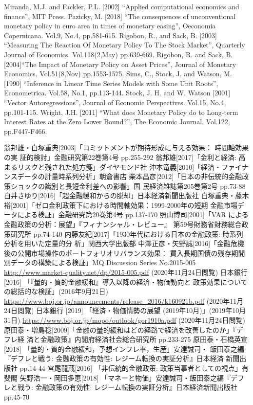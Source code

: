 \documentclass[12pt]{article}
\begin{document}
\begin{thebibliography}{99}
    \bibitem{} Miranda, M.J. and Fackler, P.L. [2002] “Applied computational economics and
    finance”, MIT Press.
    \bibitem{} Pazicky, M. [2018] “The consequences of unconventional monetary policy in euro
    area in times of monetary easing”, Oeconomia Copernicana. Vol.9, No.4, pp.581-615.
    \bibitem{} Rigobon, R., and Sack, B. [2003] “Measuring The Reaction Of Monetary Policy To
    The Stock Market”, Quarterly Journal of Economics. Vol.118(2,May) pp.639-669.
    \bibitem{} Rigobon, R. and Sack, B. [2004]“The Impact of Monetary Policy on Asset Prices”,
    Journal of Monetary Economics. Vol.51(8,Nov) pp.1553-1575.
    \bibitem{} Sims, C., Stock, J. and Watson, M. [1990] “Inference in Linear Time Series Models
    with Some Unit Roots”, Econometrica. Vol.58, No.1, pp.113-144.
    \bibitem{} Stock, J. H. and W. Watson [2001] “Vector Autoregressions”, Journal of Economic
    Perspectives. Vol.15, No.4, pp.101-115.
    \bibitem{} Wright, J.H. [2011] “What does Monetary Policy do to Long-term Interest Rates
    at the Zero Lower Bound?”, The Economic Journal. Vol.122, pp.F447-F466.
    
    \bibitem{}  翁邦雄・白塚重典[2003]「コミットメントが期待形成に与える効果： 時間軸効果の実
    証的検討」金融研究第22巻第4号 pp.255-292
    \bibitem{} 翁邦雄[2017]「金利と経済: 高まるリスクと残された処方箋」ダイヤモンド社
    \bibitem{} 沖本竜義[2010]「経済・ファイナンスデータの計量時系列分析」朝倉書店
    \bibitem{} 柴本昌彦[2012]「日本の非伝統的金融政策ショックの識別と長短金利差への影響」国
    民経済雑誌第205巻第2号 pp.73-88
    \bibitem{} 白井さゆり[2016]「超金融緩和からの脱却」日本経済新聞出版社
    \bibitem{} 白塚重典・藤木裕[2001]「ゼロ金利政策下における時間軸効果：1999-2000年の短期
    金融市場データによる検証」金融研究第20巻第4号 pp.137-170
    \bibitem{} 照山博司[2001]「VAR による金融政策の分析：展望」『フィナンシャル・レビュー』
    第59号財務省財務総合政策研究所 pp.74-140
    \bibitem{} 内藤友紀[2017]「1930年代における日本の金融政策: 時系列分析を用いた定量的分
    析」関西大学出版部
    \bibitem{} 中澤正彦・矢野誠[2016]「金融危機後の公開市場操作のポートフォリオリバランス効果：
    買入長期国債の残存期間別データの構築による検証」MQ Discussion Series No.2015-005
    \url{http://www.market-quality.net/dp/2015-005.pdf} (2020年11月24日閲覧)
    \bibitem{} 日本銀行 [2016] 「『量的・質的金融緩和』導入以降の経済・物価動向と
    政策効果についての総括的な検証」(2016年9月21日) \url{https://www.boj.or.jp/announcements/release_2016/k160921b.pdf} (2020年11月24日閲覧)
    \bibitem{} 日本銀行 [2019] 「経済・物価情勢の展望 (2019年10月)」(2019年10月31日) \url{https://www.boj.or.jp/mopo/outlook/gor1910a.pdf} (2020年11月24日閲覧)
    \bibitem{} 原田泰・増島稔[2009]「金融の量的緩和はどの経路で経済を改善したのか」『デフレ経
    済と金融政策』内閣府経済社会総合研究所 pp.233-275
    \bibitem{} 原田泰・石橋英宣[2018] 「量的・質的金融緩和，予想インフレ率，生産」安達誠司・
    飯田泰之編『デフレと戦う: 金融政策の有効性: レジーム転換の実証分析』日本経済
    新聞出版社 pp.14-44
    \bibitem{} 宮尾龍蔵[2016] 「非伝統的金融政策: 政策当事者としての視点」有斐閣
    \bibitem{} 矢野浩一・岡田多恵[2018] 「マネーと物価」安達誠司・飯田泰之編『デフレと戦う:
    金融政策の有効性: レジーム転換の実証分析』日本経済新聞出版社 pp.45-70
    
\end{thebibliography}
\end{document}
